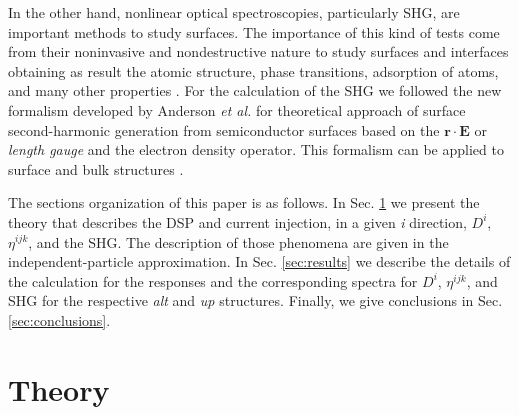 \documentclass[aps,pra,11pt,tightenlines,showpacs,superscriptaddress,groupedaddress]{revtex4-1}
\begin{document}
In the other hand, nonlinear optical spectroscopies, particularly SHG, are
important methods to study surfaces. The importance of this kind of tests come
from their noninvasive and nondestructive nature to study surfaces and
interfaces obtaining as result the atomic structure, phase transitions,
adsorption of atoms, and many other properties \cite{dadap1997second,
daum1993identification,mcgilp1994probing,power1995resonant,
godefroy1996electric,salazar2014molecular,chen1981surface,
mendoza1998microscopic}. For the calculation of the SHG we followed the new
formalism developed by Anderson \emph{et al.} for theoretical approach of
surface second-harmonic generation from semiconductor surfaces
\cite{anderson2015theory} based on the $\mathbf{r}\cdot\mathbf{E} $ or
\textit{length gauge} and the electron density operator. This formalism can be
applied to surface and bulk structures \cite{anderson2015theory,sipe2000second}.

The sections organization of this paper is as follows. In Sec. \ref{sec:theory}
we present the theory that describes the DSP and current injection, in a given
\emph{i} direction, $D^{i}$, $\eta^{ijk}$, and the SHG. The description of
those phenomena are given in the independent-particle approximation. In Sec.
\ref{sec:results} we describe the details of the calculation for the responses
and the corresponding spectra for  $D^{i}$, $\eta^{ijk}$, and SHG for the
respective \emph{alt} and \emph{up} structures. Finally, we give conclusions in
Sec. \ref{sec:conclusions}.





\section{Theory} 
\label{sec:theory}
\end{document}
